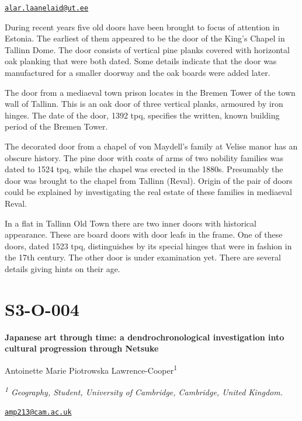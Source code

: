 \documentclass[
]{book}
\begin{document}
\href{mailto:alar.laanelaid@ut.ee}{\nolinkurl{alar.laanelaid@ut.ee}}

During recent years five old doors have been brought to focus of attention in Estonia. The earliest of them appeared to be the door of the King's Chapel in Tallinn Dome. The door consists of vertical pine planks covered with horizontal oak planking that were both dated. Some details indicate that the door was manufactured for a smaller doorway and the oak boards were added later.

The door from a mediaeval town prison locates in the Bremen Tower of the town wall of Tallinn. This is an oak door of three vertical planks, armoured by iron hinges. The date of the door, 1392 tpq, specifies the written, known building period of the Bremen Tower.

The decorated door from a chapel of von Maydell's family at Velise manor has an obscure history. The pine door with coats of arms of two nobility families was dated to 1524 tpq, while the chapel was erected in the 1880s. Presumably the door was brought to the chapel from Tallinn (Reval). Origin of the pair of doors could be explained by investigating the real estate of these families in mediaeval Reval.

In a flat in Tallinn Old Town there are two inner doors with historical appearance. These are board doors with door leafs in the frame. One of these doors, dated 1523 tpq, distinguishes by its special hinges that were in fashion in the 17th century. The other door is under examination yet. There are several details giving hints on their age.

\hypertarget{s3-o-004}{%
\section*{S3-O-004}\label{s3-o-004}}

\textbf{Japanese art through time: a dendrochronological investigation into cultural progression through Netsuke}

Antoinette Marie Piotrowska Lawrence-Cooper\textsuperscript{1}

\emph{\textsuperscript{1} Geography, Student, University of Cambridge, Cambridge, United Kingdom.}

\href{mailto:amp213@cam.ac.uk}{\nolinkurl{amp213@cam.ac.uk}}
\end{document}
